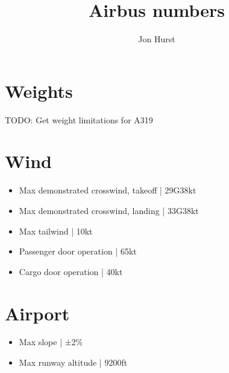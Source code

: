 \documentclass[a4paper]{article}
\title{Airbus numbers}
\author{Jon Hurst}
\begin{document}
\section{Weights}
TODO: Get weight limitations for A319

\section{Wind}
\begin{itemize}
\item Max demonstrated crosswind, takeoff | 29G38kt
\item Max demonstrated crosswind, landing | 33G38kt
\item Max tailwind | 10kt
\item Passenger door operation | 65kt
\item Cargo door operation | 40kt
\end{itemize}

\section{Airport}
\begin{itemize}
\item Max slope | ±2\%
\item Max runway altitude | 9200ft

\end{itemize}
\end{document}
